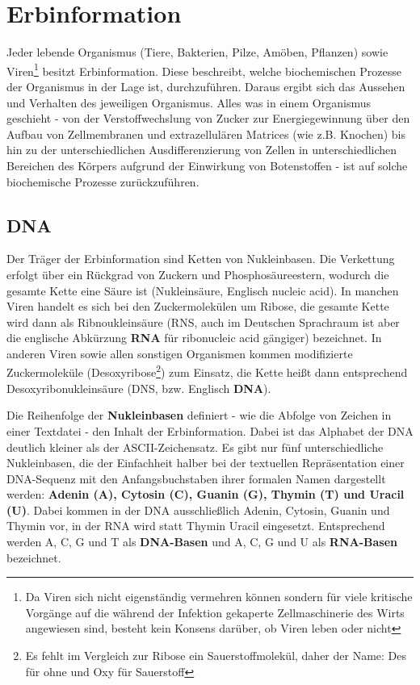 \section{Erbinformation}
  Jeder lebende Organismus (Tiere, Bakterien, Pilze, Amöben, Pflanzen) sowie Viren\footnote{Da Viren sich nicht eigenständig vermehren können sondern für viele kritische Vorgänge auf die während der Infektion gekaperte Zellmaschinerie des Wirts angewiesen sind, besteht kein Konsens darüber, ob Viren leben oder nicht} besitzt Erbinformation. Diese beschreibt, welche biochemischen Prozesse der Organismus in der Lage ist, durchzuführen. Daraus ergibt sich das Aussehen und Verhalten des jeweiligen Organismus. Alles was in einem Organismus geschieht - von der Verstoffwechslung von Zucker zur Energiegewinnung über den Aufbau von Zellmembranen und extrazellulären Matrices (wie z.B. Knochen) bis hin zu der unterschiedlichen Ausdifferenzierung von Zellen in unterschiedlichen Bereichen des Körpers aufgrund der Einwirkung von Botenstoffen - ist auf solche biochemische Prozesse zurückzuführen. 

\subsection{DNA}
  Der Träger der Erbinformation sind Ketten von Nukleinbasen. Die Verkettung erfolgt über ein Rückgrad von Zuckern und Phosphosäureestern, wodurch die gesamte Kette eine Säure ist (Nukleinsäure, Englisch nucleic acid). In manchen Viren handelt es sich bei den Zuckermolekülen um Ribose, die gesamte Kette wird dann als Ribnoukleinsäure (RNS, auch im Deutschen Sprachraum ist aber die englische Abkürzung \textbf{RNA} für ribonucleic acid gängiger) bezeichnet. In anderen Viren sowie allen sonstigen Organismen kommen modifizierte Zuckermoleküle (Desoxyribose\footnote{Es fehlt im Vergleich zur Ribose ein Sauerstoffmolekül, daher der Name: Des für ohne und Oxy für Sauerstoff}) zum Einsatz, die Kette heißt dann entsprechend Desoxyribonukleinsäure (DNS, bzw. Englisch \textbf{DNA}). 

  Die Reihenfolge der \textbf{Nukleinbasen} definiert - wie die Abfolge von Zeichen in einer Textdatei - den Inhalt der Erbinformation. Dabei ist das Alphabet der DNA deutlich kleiner als der ASCII-Zeichensatz. Es gibt nur fünf unterschiedliche Nukleinbasen, die der Einfachheit halber bei der textuellen Repräsentation einer DNA-Sequenz mit den Anfangsbuchstaben ihrer formalen Namen dargestellt werden: \textbf{Adenin (A), Cytosin (C), Guanin (G), Thymin (T) und Uracil (U)}. Dabei kommen in der DNA ausschließlich Adenin, Cytosin, Guanin und Thymin vor, in der RNA wird statt Thymin Uracil eingesetzt. Entsprechend werden A, C, G und T als \textbf{DNA-Basen} und A, C, G und U als \textbf{RNA-Basen} bezeichnet. 


